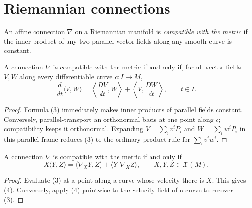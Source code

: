 \section{Riemannian connections}

\begin{definition}
  \label{def:dc-ch2-3-1}
  \leanok
  An affine connection $\nabla$ on a Riemannian manifold is \emph{compatible
  with the metric} if the inner product of any two parallel vector fields along
  any smooth curve is constant.
\end{definition}

\begin{proposition}
  \label{prop:dc-ch2-3-2}
  \leanok
  A connection $\nabla$ is compatible with the metric if and only if, for all
  vector fields $V,W$ along every differentiable curve $c\colon I\to M$,
  \[
    \frac{d}{dt}\langle V,W\rangle
      =\left\langle\frac{DV}{dt},W\right\rangle
       +\left\langle V,\frac{DW}{dt}\right\rangle,
    \qquad t\in I.\tag{3}
  \]
\end{proposition}
\begin{proof}
  \leanok
  \sketch
  Formula (3) immediately makes inner products of parallel fields constant.
  Conversely, parallel-transport an orthonormal basis at one point along $c$;
  compatibility keeps it orthonormal. Expanding
  $V=\sum_iv^iP_i$ and $W=\sum_iw^iP_i$ in this parallel frame reduces (3) to
  the ordinary product rule for $\sum_iv^iw^i$.
\end{proof}

\begin{corollary}
  \label{cor:dc-ch2-3-3}
  \leanok
  A connection $\nabla$ is compatible with the metric if and only if
  \[
    X\langle Y,Z\rangle
      =\langle\nabla_XY,Z\rangle+\langle Y,\nabla_XZ\rangle,
    \qquad X,Y,Z\in\mathcal{X}(M).\tag{4}
  \]
\end{corollary}
\begin{proof}
  \sketch
  Evaluate (3) at a point along a curve whose velocity there is $X$. This gives
  (4). Conversely, apply (4) pointwise to the velocity field of a curve to
  recover (3).
\end{proof}


